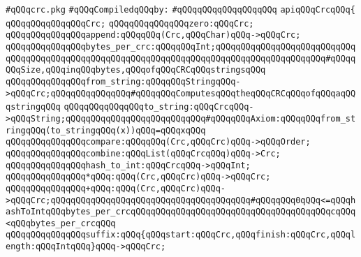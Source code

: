 \label{src/lib/compiler/src/library/crc.pkg}
\verb|#qQQqcrc.pkg|\newline
\newline
\verb|#qQQqCompiledqQQqby:|\newline
\verb|#qQQqqQQqqQQqqQQqqQQq|\newline
\newline
\newline
\verb|apiqQQqCrcqQQq{|\newline
\newline
\verb|qQQqqQQqqQQqqQQqCrc;|\newline
\newline
\verb|qQQqqQQqqQQqqQQqzero:qQQqCrc;|\newline
\verb|qQQqqQQqqQQqqQQqappend:qQQqqQQq(Crc,qQQqChar)qQQq->qQQqCrc;|\newline
\newline
\verb|qQQqqQQqqQQqqQQqbytes_per_crc:qQQqqQQqInt;qQQqqQQqqQQqqQQqqQQqqQQqqQQqqQQqqQQqqQQqqQQqqQQqqQQqqQQqqQQqqQQqqQQqqQQqqQQqqQQqqQQqqQQqqQQq#qQQqqQQqSize,qQQqinqQQqbytes,qQQqofqQQqCRCqQQqstringsqQQq|\newline
\newline
\verb|qQQqqQQqqQQqqQQqfrom_string:qQQqqQQqStringqQQq->qQQqCrc;qQQqqQQqqQQqqQQq#qQQqqQQqComputesqQQqtheqQQqCRCqQQqofqQQqaqQQqstringqQQq|\newline
\newline
\verb|qQQqqQQqqQQqqQQqto_string:qQQqCrcqQQq->qQQqString;qQQqqQQqqQQqqQQqqQQqqQQqqQQq#qQQqqQQqAxiom:qQQqqQQqfrom_stringqQQq(to_stringqQQq(x))qQQq=qQQqxqQQq|\newline
\verb|qQQqqQQqqQQqqQQqcompare:qQQqqQQq(Crc,qQQqCrc)qQQq->qQQqOrder;|\newline
\verb|qQQqqQQqqQQqqQQqcombine:qQQqList(qQQqCrcqQQq)qQQq->Crc;|\newline
\verb|qQQqqQQqqQQqqQQqhash_to_int:qQQqCrcqQQq->qQQqInt;|\newline
\verb|qQQqqQQqqQQqqQQq*qQQq:qQQq(Crc,qQQqCrc)qQQq->qQQqCrc;|\newline
\verb|qQQqqQQqqQQqqQQq+qQQq:qQQq(Crc,qQQqCrc)qQQq->qQQqCrc;qQQqqQQqqQQqqQQqqQQqqQQqqQQqqQQqqQQqqQQq#qQQqqQQq0qQQq<=qQQqhashToIntqQQqbytes_per_crcqQQqqQQqqQQqqQQqqQQqqQQqqQQqqQQqqQQqqQQqcqQQq<qQQqbytes_per_crcqQQq|\newline
\newline
\verb|qQQqqQQqqQQqqQQqsuffix:qQQq{qQQqstart:qQQqCrc,qQQqfinish:qQQqCrc,qQQqlength:qQQqIntqQQq}qQQq->qQQqCrc;|\newline
